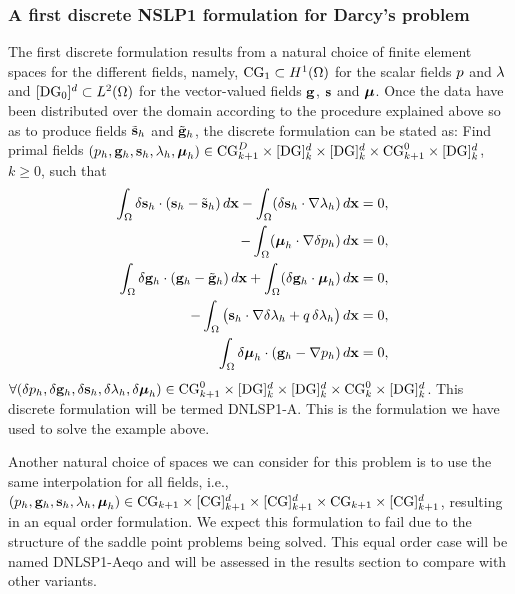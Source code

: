 \subsubsection{A first discrete NSLP1 formulation for Darcy's problem}

The first discrete formulation results from a natural choice
of finite element spaces for the different fields, namely,
$\text{CG}_1 \subset H^1(\Omega)$ for the scalar fields $p$ and $\lambda$
and $[\text{DG}_0]^d \subset L^2(\Omega)$ for the vector-valued
fields $\mathbf{g}$, $\mathbf{s}$ and $\boldsymbol{\mu}$. Once the data have been
distributed over the domain according to the procedure
explained above so as to produce fields $\tilde{\mathbf{s}}_h$
and $\tilde{\mathbf{g}}_h$, the discrete formulation can be stated
as: Find primal fields
$(p_h,\mathbf{g}_h, \mathbf{s}_h, \lambda_h, \boldsymbol{\mu}_h ) \in \text{CG}^D_{k+1}\times [\text{DG}]_k^d \times [\text{DG}]_k^d
\times \text{CG}^0_{k+1} \times [\text{DG}]_k^d$, $k \ge 0$, such that
\begin{equation}
        \begin{aligned}
                \int_{\Omega}  \delta \mathbf{s}_h \cdot (\mathbf{s}_h - \tilde{\mathbf{s}}_h) \, d\mathbf{x} -
                \int_{\Omega}(\delta \mathbf{s}_h \cdot \nabla \lambda_h ) \, d\mathbf{x} & = 0, & \\
                 - \int_{\Omega}( \boldsymbol{\mu}_h \cdot  \nabla \delta p_h ) \, d\mathbf{x} & = 0, &\\
                \int_{\Omega}  \delta \mathbf{g}_h \cdot (\mathbf{g}_h - \tilde{\mathbf{g}}_h) \, d\mathbf{x}  + \int_{\Omega} (\delta \mathbf{g}_h \cdot \boldsymbol{\mu}_h) \, d\mathbf{x} & = 0, &\\
                -\int_{\Omega} \big(\mathbf{s}_h \cdot \nabla \delta \lambda_h + q \, \delta \lambda_h \big) \, d\mathbf{x} & = 0, & \\
                \int_{\Omega} \delta \boldsymbol{\mu}_h \cdot (\mathbf{g}_h -  \nabla p_h) \, d\mathbf{x} & = 0, &
        \end{aligned}
\end{equation}
$\forall (\delta p_h,\delta\mathbf{g}_h, \delta\mathbf{s}_h, \delta\lambda_h, \delta\boldsymbol{\mu}_h ) \in \text{CG}^0_{k+1}\times [\text{DG}]^d_{k} \times [\text{DG}]^d_{k}
\times \text{CG}^0_k \times [\text{DG}]^d_{k}$.
This discrete formulation will be termed DNLSP1-A. This is 
the formulation we have used to solve the example above.

Another natural choice of spaces we can consider for this problem is to use 
the same interpolation for all fields, i.e., 
$(p_h,\mathbf{g}_h, \mathbf{s}_h, \lambda_h, \boldsymbol{\mu}_h ) \in \text{CG}_{k+1 }\times [\text{CG}]^d_{k+1} \times [\text{CG}]^d_{k+1}
\times \text{CG}_{k+1} \times [\text{CG}]^d_{k+1}$, resulting in an equal order formulation. 
We expect this formulation to fail due to the structure of the saddle point problems 
being solved. This equal order case will be named DNLSP1-Aeqo and will be assessed 
in the results section to compare with other variants.

